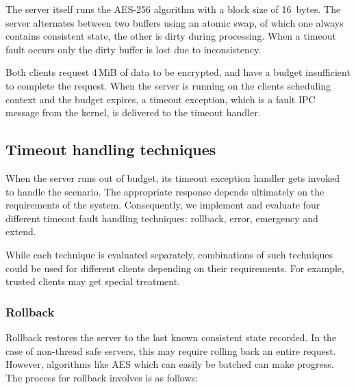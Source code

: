 The server itself runs the AES-256 algorithm with a block size of 16~bytes. The server alternates between two
buffers using an atomic swap, of which one always contains consistent state, the other is
dirty during processing. When a timeout fault occurs only the dirty buffer is lost due to
inconsistency. 

Both clients request 4\,MiB of data to be encrypted, and have a budget insufficient to
complete the request. When the server is running on the clients scheduling context and the budget
expires, a timeout exception, which is a fault IPC message from the kernel, is delivered to the timeout
handler. 

\subsection{Timeout handling techniques}

When the server runs out of budget, its timeout exception handler gets invoked to handle the
scenario. The appropriate response depends ultimately on the requirements of the system.
Consequently, we implement and evaluate four different timeout fault handling techniques: rollback, error,
emergency and extend. 

While each technique is evaluated separately, combinations of such techniques could be used for
different clients depending on their requirements. For example, trusted clients may get special
treatment. 

\subsubsection{Rollback}

Rollback restores the server to the last known consistent state recorded. In the case of non-thread
safe servers, this may require rolling back an entire request. However, algorithms like \gls{AES}
which can easily be batched can make progress. The process for rollback involves is as follows:

